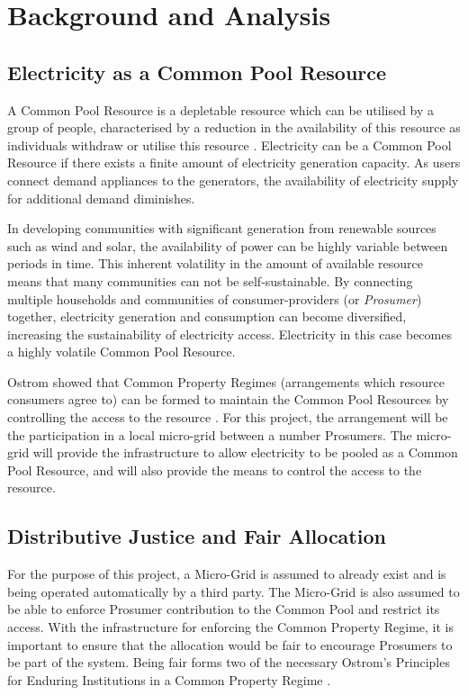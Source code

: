 \chapter{Background and Analysis}
\label{Background}

\section*{Electricity as a Common Pool Resource}
A Common Pool Resource is a depletable resource which can be utilised by a group of people, characterised by a reduction in the availability of this resource as individuals withdraw or utilise this resource \cite{Ostrom:90}.  Electricity can be a Common Pool Resource if there exists a finite amount of electricity generation capacity. As users connect demand appliances to the generators, the availability of electricity supply for additional demand diminishes.

In developing communities with significant generation from renewable sources such as wind and solar, the availability of power can be highly variable between periods in time. This inherent volatility in the amount of available resource means that many communities can not be self-sustainable. By connecting multiple households and communities of consumer-providers (or \textit{Prosumer}) together, electricity generation and consumption can become diversified, increasing the sustainability of electricity access. Electricity in this case becomes a highly volatile Common Pool Resource.

Ostrom showed that Common Property Regimes (arrangements which resource consumers agree to) can be formed to maintain the Common Pool Resources by controlling the access to the resource \cite{Ostrom:90}. For this project, the arrangement will be the participation in a local micro-grid between a number Prosumers. The micro-grid will provide the infrastructure to allow electricity to be pooled as a Common Pool Resource, and will also provide the means to control the access to the resource.

\section*{Distributive Justice and Fair Allocation}
For the purpose of this project, a Micro-Grid is assumed to already exist and is being operated automatically by a third party. The Micro-Grid is also assumed to be able to enforce Prosumer contribution to the Common Pool and restrict its access. With the infrastructure for enforcing the Common Property Regime, it is important to ensure that the allocation would be fair to encourage Prosumers to be part of the system. Being fair forms two of the necessary Ostrom's Principles for Enduring Institutions in a Common Property Regime \cite{Ostrom:90}. \\

